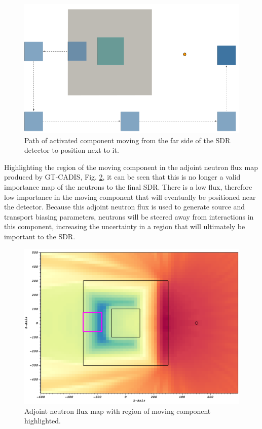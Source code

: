 \begin{figure} 
	\includegraphics[scale=0.6]{figs/moving_comp_path.png}
	\caption[Path of moving component]
	{Path of activated component moving from the far side of the SDR
	detector to position next to it.\label{fig:path}}
\end{figure}

Highlighting the region of the moving component in the  adjoint neutron flux
map produced by GT-CADIS, Fig. \ref{fig:highlight}, it can be seen that this 
is no longer a valid importance map
of the neutrons to the final SDR. There is a low flux, therefore low
importance in the moving component that will eventually be positioned 
near the detector.  Because this adjoint neutron flux is used to generate
source and transport biasing parameters, neutrons will be steered away from 
interactions in this component, increasing the uncertainty in a region that will
ultimately be important to the SDR. 

\begin{figure} 
	\includegraphics[scale=0.6]{figs/adj_n_highlight.png}
	\caption[Adjoint neutron flux map with region of moving component
	highlighted.]
	{Adjoint neutron flux map with region of moving component
	highlighted. \label{fig:highlight}}
\end{figure}


